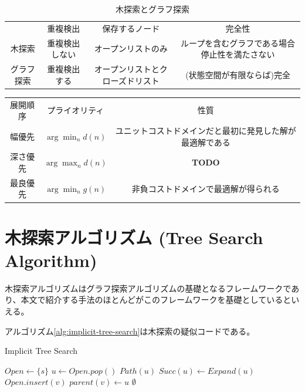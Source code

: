 \documentclass[b5paper]{report}
\newcommand{\TODO}{{\bf TODO}}
\begin{document}
\begin{table}
\caption{木探索とグラフ探索}
\label{tbl:tree-vs-graph-search}
\begin{adjustbox}{width=\textwidth}
\begin{tabular}{cccc}
				& 重複検出  	  & 保存するノード & 完全性 \\
	木探索  		& 重複検出しない & オープンリストのみ & ループを含むグラフである場合停止性を満たさない \\
	グラフ探索 		& 重複検出する  & オープンリストとクローズドリスト & (状態空間が有限ならば)完全 \\ 
\end{tabular}
\end{adjustbox}
\end{table}


\begin{table}
\label{tbl:basic-priority}
\begin{adjustbox}{width=\textwidth}
\begin{tabular}{ccc}
	展開順序  	& プライオリティ 	& 性質 \\  
	幅優先	& $\arg \min_n d(n)$ & ユニットコストドメインだと最初に発見した解が最適解である \\
	深さ優先 	& $\arg \max_n d(n)$ & \TODO \\
	最良優先	& $\arg \min_n g(n)$ & 非負コストドメインで最適解が得られる \\
\end{tabular}
\end{adjustbox}
\end{table}

\section{木探索アルゴリズム (Tree Search Algorithm)}
\label{sec:tree-search-algorithm}
木探索アルゴリズムはグラフ探索アルゴリズムの基礎となるフレームワークであり、本文で紹介する手法のほとんどがこのフレームワークを基礎としているといえる。

アルゴリズム\ref{alg:implicit-tree-search}は木探索の疑似コードである。

\begin{algorithm}
\caption{Implicit Tree Search}
\label{alg:implicit-tree-search}
	$Open \leftarrow \{s\}$\;
	 {
		$u \leftarrow Open.pop()$\;
		 {
			\Return $Path(u)$\;
		}
		$Succ(u) \leftarrow Expand(u)$\;
		 {
			$Open.insert(v)$\;
			$parent(v) \leftarrow u$\;
		}
 	}
	\Return $\emptyset$\;
\end{algorithm}
\end{document}
